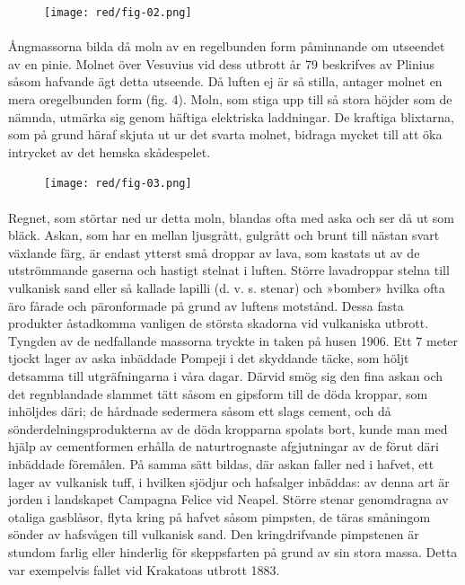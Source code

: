 \documentclass[a4paper, 12pt, oneside, swedish]{article}
\begin{document}
\begin{figure}[H]
\centering
\texttt{[image: red/fig-02.png]}
\caption{}
\end{figure}
\paragraph{}
Ångmassorna bilda då moln av en regelbunden form påminnande om utseendet av en pinie. Molnet över Vesuvius vid dess utbrott år 79 beskrifves av Plinius såsom hafvande ägt detta utseende. Då luften ej är så stilla, antager molnet en mera oregelbunden form (fig. 4). Moln, som stiga upp till så stora höjder som de nämnda, utmärka sig genom häftiga elektriska laddningar. De kraftiga blixtarna, som på grund häraf skjuta ut ur det svarta molnet, bidraga mycket till att öka intrycket av det hemska skådespelet.

\begin{figure}[H]
\centering
\texttt{[image: red/fig-03.png]}
\caption{}
\end{figure}
\paragraph{}
Regnet, som störtar ned ur detta moln, blandas ofta med aska och ser då ut som bläck. Askan, som har en mellan ljusgrått, gulgrått och brunt till nästan svart växlande färg, är endast ytterst små droppar av lava, som kastats ut av de utströmmande gaserna och hastigt stelnat i luften. Större lavadroppar stelna till vulkanisk sand eller så kallade lapilli (d. v. s. stenar) och »bomber» hvilka ofta äro fårade och päronformade på grund av luftens motstånd. Dessa fasta produkter åstadkomma vanligen de största skadorna vid vulkaniska utbrott. Tyngden av de nedfallande massorna tryckte in taken på husen 1906. Ett 7 meter tjockt lager av aska inbäddade Pompeji i det skyddande täcke, som höljt detsamma till utgräfningarna i våra dagar. Därvid smög sig den fina askan och det regnblandade slammet tätt såsom en gipsform till de döda kroppar, som inhöljdes däri; de hårdnade sedermera såsom ett slags cement, och då sönderdelningsprodukterna av de döda kropparna spolats bort, kunde man med hjälp av cementformen erhålla de naturtrognaste afgjutningar av de förut däri inbäddade föremålen. På samma sätt bildas, där askan faller ned i hafvet, ett lager av vulkanisk tuff, i hvilken sjödjur och hafsalger inbäddas: av denna art är jorden i landskapet Campagna Felice vid Neapel. Större stenar genomdragna av otaliga gasblåsor, flyta kring på hafvet såsom pimpsten, de täras småningom sönder av hafsvågen till vulkanisk sand. Den kringdrifvande pimpstenen är stundom farlig eller hinderlig för skeppsfarten på grund av sin stora massa. Detta var exempelvis fallet vid Krakatoas utbrott 1883.
\end{document}
